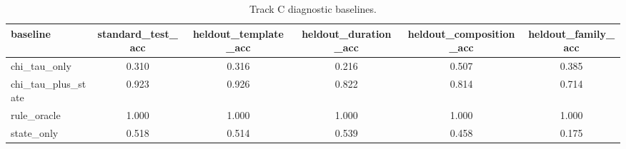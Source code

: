 \begin{table}[t]
\centering
\caption{Track C diagnostic baselines.}
\label{tab:track-c-baselines}
\footnotesize
\begin{tabular}{lccccc}
\toprule
baseline & standard_test_acc & heldout_template_acc & heldout_duration_acc & heldout_composition_acc & heldout_family_acc \\
\midrule
chi_tau_only & 0.310 & 0.316 & 0.216 & 0.507 & 0.385 \\
chi_tau_plus_state & 0.923 & 0.926 & 0.822 & 0.814 & 0.714 \\
rule_oracle & 1.000 & 1.000 & 1.000 & 1.000 & 1.000 \\
state_only & 0.518 & 0.514 & 0.539 & 0.458 & 0.175 \\
\bottomrule
\end{tabular}
\end{table}
